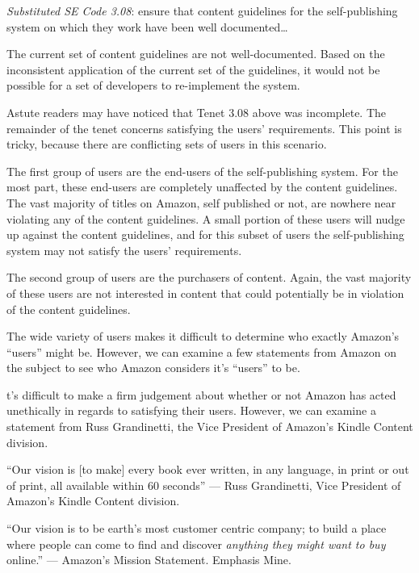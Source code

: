 \documentclass[11pt]{article}
\begin{document}
\begin{multicols}{2}
\emph{Substituted SE Code 3.08}: ensure that content guidelines for the self-publishing system on which they work have been well documented\ldots

The current set of content guidelines are not well-documented.  Based on the inconsistent application of the current set of the guidelines, it would not be possible for a set of developers to re-implement the system.

Astute readers may have noticed that Tenet 3.08 above was incomplete. The remainder of the tenet concerns satisfying the users' requirements. This point is tricky, because there are conflicting sets of users in this scenario.  

The first group of users are the end-users of the self-publishing system.  For the most part, these end-users are completely unaffected by the content guidelines.  The vast majority of titles on Amazon, self published or not, are nowhere near violating any of the content guidelines.  A small portion of these users will nudge up against the content guidelines, and for this subset of users the self-publishing system may not satisfy the users' requirements.

The second group of users are the purchasers of content.  Again, the vast majority of these users are not interested in content that could potentially be in violation of the content guidelines.  \cite{CitationNeeded}

The wide variety of users makes it difficult to determine who exactly Amazon's ``users'' might be.  However, we can examine a few statements from Amazon on the subject to see who Amazon considers it's ``users'' to be.  


t's difficult to make a firm judgement about whether or not Amazon has acted unethically in regards to satisfying their users.  However, we can examine a statement from Russ Grandinetti, the Vice President of Amazon's Kindle Content division.

``Our vision is [to make] every book ever written, in any language, in print or out of print, all available within 60 seconds'' --- Russ Grandinetti, Vice President of Amazon's Kindle Content division. \cite{LATimesRussQuote}

``Our vision is to be earth's most customer centric company; to build a place where people can come to find and discover \emph{anything they might want to buy} online.'' --- Amazon's Mission Statement.  Emphasis Mine. \cite{AmazonIRFAQ}


\end{multicols}
\end{document}
